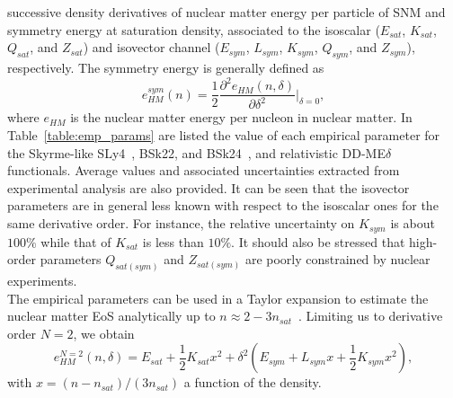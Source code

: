 successive density derivatives of nuclear matter energy per particle of SNM 
and symmetry energy at saturation density, associated to the isoscalar
($E_{sat}$, $K_{sat}$, $Q_{sat}$, and $Z_{sat}$) and isovector channel ($E_{sym}$,
$L_{sym}$, $K_{sym}$, $Q_{sym}$, and $Z_{sym}$), respectively. 
The symmetry energy is generally defined as
%
\begin{equation}
  e_{HM}^{sym}(n) = \frac{1}{2}\frac{\partial^2 e_{HM}(n,\delta)}{\partial
  \delta^2}\bigg|_{\delta=0},\label{eq:esym}
\end{equation}
%
where $e_{HM}$ is the nuclear matter energy per nucleon in nuclear matter. In
Table~\ref{table:emp_params} are listed the value of each empirical parameter
for the Skyrme-like SLy4~\cite{Chabanat1998}, BSk22, and
BSk24~\cite{Goriely2013}, and relativistic
DD-ME$\delta$~\cite{RocaMaza2011} functionals. Average values and associated
uncertainties extracted from experimental analysis are also provided. It can be
seen that the isovector parameters are in general less known with respect to
the isoscalar ones for the same derivative order. For instance, the relative
uncertainty on $K_{sym}$ is about $100\%$ while that of $K_{sat}$ is less than
$10\%$. It should also be stressed that high-order parameters $Q_{sat(sym)}$
and $Z_{sat(sym)}$ are poorly constrained by nuclear experiments.\\
The empirical parameters can be used in a Taylor expansion to estimate the
nuclear matter EoS analytically up to 
$n \approx 2-3n_{sat}$~\cite{Margueron2018a,Margueron2018b}. Limiting us to 
derivative order $N=2$, we obtain
%
\begin{equation}
  e^{N=2}_{HM}(n,\delta) = E_{sat} + \frac{1}{2}K_{sat}x^2 
  + \delta^2 (E_{sym} + L_{sym}x +\frac{1}{2}K_{sym}x^2),
\end{equation}
%
with $x = (n-n_{sat})/(3n_{sat})$ a function of the density. 


